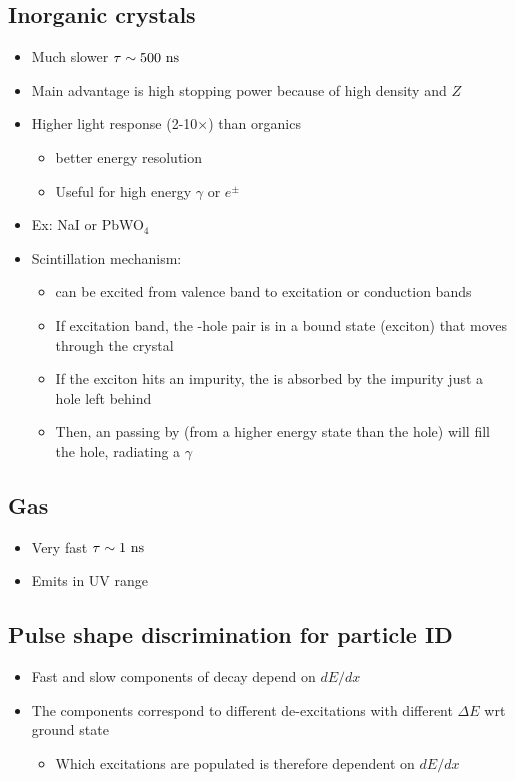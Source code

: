 \subsection{Inorganic crystals}
\begin{itemize}
  \item Much slower $\tau\sim 500~\text{ns}$
  \item Main advantage is high stopping power because of high density and $Z$
  \item Higher light response (2-10$\times$) than organics
  \begin{itemize}
    \item \thus better energy resolution
    \item Useful for high energy $\gamma$ or $e^\pm$
  \end{itemize}
  \item Ex: NaI or PbWO$_4$
  \item Scintillation mechanism:
  \begin{itemize}
    \item \el can be excited from valence band to excitation or conduction bands
    \item If excitation band, the \el-hole pair is in a bound state (exciton) that moves through the crystal
    \item If the exciton hits an impurity, the \el is absorbed by the impurity \thus just a hole left behind
    \item Then, an \el passing by (from a higher energy state than the hole) will fill the hole, radiating a $\gamma$ 
  \end{itemize}
\end{itemize}

\subsection{Gas}
\begin{itemize}
  \item Very fast $\tau\sim 1~\text{ns}$
  \item Emits in UV range
\end{itemize}

\subsection{Pulse shape discrimination for particle ID}
\begin{itemize}
  \item Fast and slow components of decay depend on $dE/dx$
  \item The components correspond to different de-excitations with different $\Delta E$ wrt ground state
  \begin{itemize}
    \item Which excitations are populated is therefore dependent on $dE/dx$
  \end{itemize}
\end{itemize}

